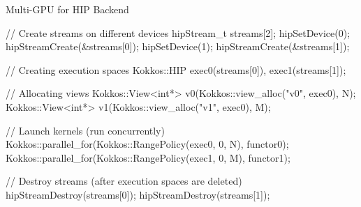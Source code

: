 \begin{frame}[fragile]{Multi-GPU for HIP Backend}
  \begin{code}[keywords={auto}]
// Create streams on different devices
hipStream_t streams[2];
hipSetDevice(0); hipStreamCreate(&streams[0]);
hipSetDevice(1); hipStreamCreate(&streams[1]);
{
  // Creating execution spaces 
  Kokkos::HIP exec0(streams[0]), exec1(streams[1]);

  // Allocating views
  Kokkos::View<int*> v0(Kokkos::view_alloc("v0", exec0), N);
  Kokkos::View<int*> v1(Kokkos::view_alloc("v1", exec0), M);

  // Launch kernels (run concurrently)
  Kokkos::parallel_for(Kokkos::RangePolicy(exec0, 0, N), functor0);
  Kokkos::parallel_for(Kokkos::RangePolicy(exec1, 0, M), functor1);
}
// Destroy streams (after execution spaces are deleted)
hipStreamDestroy(streams[0]); hipStreamDestroy(streams[1]);
  \end{code}
\end{frame}


